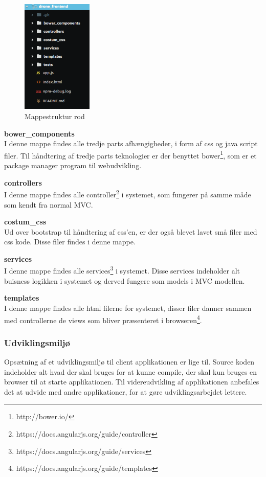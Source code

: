 \begin{figure}[H]
	\centering
	\includegraphics[width=0.3\textwidth]{Billeder/implementation/mappestruktur_client.png}
	\caption{Mappestruktur rod}
	\label{fig:mappestruktur_client}
\end{figure}

\newpage

\textbf{bower\_components}\\
I denne mappe findes alle tredje parts afhængigheder, i form af css og java script filer. Til håndtering af tredje parts teknologier er der benyttet bower\footnote{http://bower.io/}, som er et package manager program til webudvikling.

\textbf{controllers}\\
I denne mappe findes alle controller\footnote{https://docs.angularjs.org/guide/controller} i systemet, som fungerer på samme måde som kendt fra normal MVC.

\textbf{costum\_css}\\
Ud over bootstrap til håndtering af css'en, er der også blevet lavet små filer med css kode. Disse filer findes i denne mappe.

\textbf{services}\\
I denne mappe findes alle services\footnote{https://docs.angularjs.org/guide/services} i systemet. Disse services indeholder alt buisness logikken i systemet og derved fungere som models i MVC modellen.

\textbf{templates}\\
I denne mappe findes alle html filerne for systemet, disser filer danner sammen med controllerne de views som bliver præsenteret i browseren\footnote{https://docs.angularjs.org/guide/templates}.

\subsubsection*{Udviklingsmiljø}
Opsætning af et udviklingsmiljø til client applikationen er lige til. Source koden indeholder alt hvad der skal bruges for at kunne compile, der skal kun bruges en browser til at starte applikationen. Til videreudvikling af applikationen anbefales det at udvide med andre applikationer, for at gøre udviklingsarbejdet lettere.

